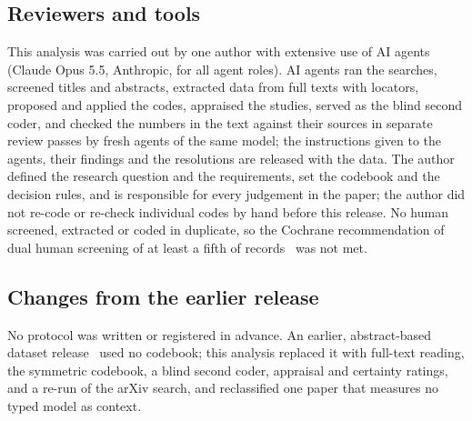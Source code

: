 \subsection{Reviewers and tools}

This analysis was carried out by one author with extensive use of AI agents (Claude Opus 5.5, Anthropic, for all agent roles).
AI agents ran the searches, screened titles and abstracts, extracted data from full texts with locators, proposed and applied the codes, appraised the studies, served as the blind second coder, and checked the numbers in the text against their sources in separate review passes by fresh agents of the same model; the instructions given to the agents, their findings and the resolutions are released with the data.
The author defined the research question and the requirements, set the codebook and the decision rules, and is responsible for every judgement in the paper; the author did not re-code or re-check individual codes by hand before this release.
No human screened, extracted or coded in duplicate, so the Cochrane recommendation of dual human screening of at least a fifth of records~\cite{garritty2021cochrane} was not met.

\subsection{Changes from the earlier release}

No protocol was written or registered in advance.
An earlier, abstract-based dataset release~\cite{survey01} used no codebook; this analysis replaced it with full-text reading, the symmetric codebook, a blind second coder, appraisal and certainty ratings, and a re-run of the arXiv search, and reclassified one paper that measures no typed model as context.
